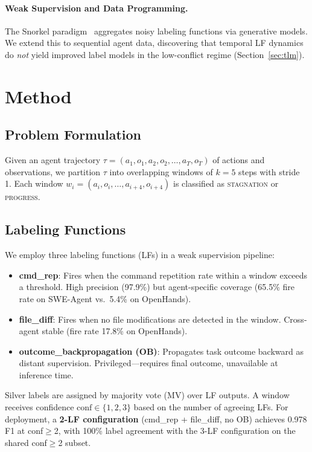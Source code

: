 \documentclass[11pt,a4paper]{article}
\begin{document}
\paragraph{Weak Supervision and Data Programming.}
The Snorkel paradigm~\cite{ratner2017snorkel} aggregates noisy labeling functions via generative models.
We extend this to sequential agent data, discovering that temporal LF dynamics do \emph{not} yield improved label models in the low-conflict regime (Section~\ref{sec:tlm}).

\section{Method}
\label{sec:method}

\subsection{Problem Formulation}

Given an agent trajectory $\tau = (a_1, o_1, a_2, o_2, \ldots, a_T, o_T)$ of actions and observations, we partition $\tau$ into overlapping windows of $k=5$ steps with stride 1.
Each window $w_i = (a_i, o_i, \ldots, a_{i+4}, o_{i+4})$ is classified as \textsc{stagnation} or \textsc{progress}.

\subsection{Labeling Functions}

We employ three labeling functions (LFs) in a weak supervision pipeline:

\begin{itemize}
\item \textbf{cmd\_rep}: Fires when the command repetition rate within a window exceeds a threshold. High precision (97.9\%) but agent-specific coverage (65.5\% fire rate on SWE-Agent vs.\ 5.4\% on OpenHands).
\item \textbf{file\_diff}: Fires when no file modifications are detected in the window. Cross-agent stable (fire rate 17.8\% on OpenHands).
\item \textbf{outcome\_backpropagation (OB)}: Propagates task outcome backward as distant supervision. Privileged---requires final outcome, unavailable at inference time.
\end{itemize}

Silver labels are assigned by majority vote (MV) over LF outputs.
A window receives confidence $\text{conf} \in \{1,2,3\}$ based on the number of agreeing LFs.
For deployment, a \textbf{2-LF configuration} (cmd\_rep + file\_diff, no OB) achieves 0.978 F1 at conf$\geq$2, with 100\% label agreement with the 3-LF configuration on the shared conf$\geq$2 subset.
\end{document}
